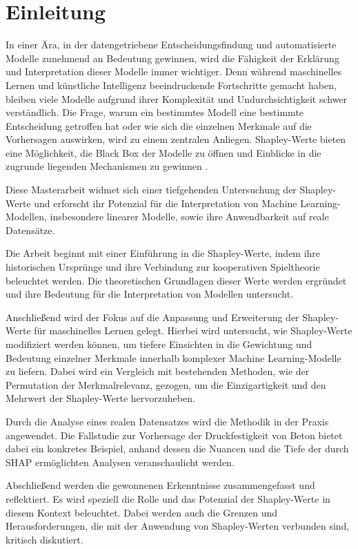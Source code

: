 \chapter{Einleitung}

In einer Ära, in der datengetriebene Entscheidungsfindung und automatisierte Modelle zunehmend an Bedeutung gewinnen,
wird die Fähigkeit der Erklärung und Interpretation dieser Modelle immer wichtiger. Denn während maschinelles Lernen und
künstliche Intelligenz beeindruckende Fortschritte gemacht haben, bleiben viele Modelle aufgrund ihrer Komplexität und Undurchsichtigkeit
schwer verständlich. Die Frage, warum ein bestimmtes Modell eine bestimmte Entscheidung getroffen hat oder wie sich die einzelnen
Merkmale auf die Vorhersagen auswirken, wird zu einem zentralen Anliegen. 
Shapley-Werte bieten eine Möglichkeit, die \glqq{}Black Box\grqq{} der Modelle zu öffnen und Einblicke 
in die zugrunde liegenden Mechanismen zu gewinnen \cite[S. 3]{Molnar_2023}. 

Diese Masterarbeit widmet sich einer tiefgehenden Untersuchung der Shapley-Werte und erforscht ihr Potenzial für die Interpretation
von Machine Learning-Modellen, insbesondere linearer Modelle, sowie ihre Anwendbarkeit auf reale Datensätze.

Die Arbeit beginnt mit einer Einführung in die Shapley-Werte, indem ihre historischen Ursprünge 
und ihre Verbindung zur kooperativen Spieltheorie beleuchtet werden. Die theoretischen Grundlagen dieser Werte werden 
ergründet und ihre Bedeutung für die Interpretation von Modellen untersucht.

Anschließend wird der Fokus auf die Anpassung und Erweiterung der Shapley-Werte für maschinelles Lernen gelegt. 
Hierbei wird untersucht, wie Shapley-Werte modifiziert werden können, um tiefere Einsichten in die Gewichtung 
und Bedeutung einzelner Merkmale innerhalb komplexer Machine Learning-Modelle zu liefern. Dabei wird ein Vergleich 
mit bestehenden Methoden, wie der Permutation der Merkmalrelevanz, gezogen, um die Einzigartigkeit und den Mehrwert der 
Shapley-Werte hervorzuheben.

Durch die Analyse eines realen Datensatzes wird die Methodik in der Praxis angewendet. Die Fallstudie zur Vorhersage der 
Druckfestigkeit von Beton bietet dabei ein konkretes Beispiel, anhand dessen die Nuancen und die Tiefe der durch SHAP 
ermöglichten Analysen veranschaulicht werden.

Abschließend werden die gewonnenen Erkenntnisse zusammengefasst und reflektiert. Es wird speziell die Rolle und das 
Potenzial der Shapley-Werte in diesem Kontext beleuchtet. Dabei werden auch die Grenzen und Herausforderungen, 
die mit der Anwendung von Shapley-Werten verbunden sind, kritisch diskutiert. 